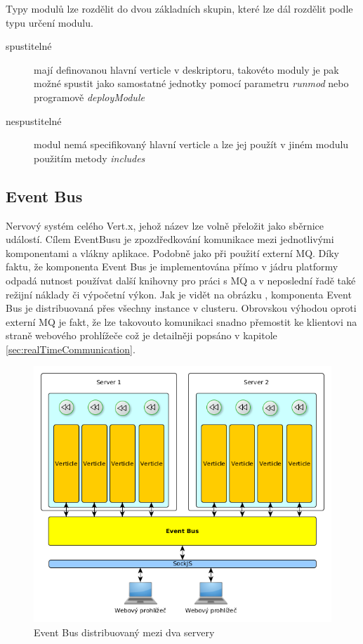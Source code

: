 Typy modulů lze rozdělit do dvou základních skupin, které lze dál rozdělit podle typu určení modulu.

\begin{description}
\item[spustitelné]{mají definovanou hlavní verticle v deskriptoru, takovéto moduly je pak možné spustit jako samostatné jednotky pomocí parametru \emph{runmod} nebo programově \emph{deployModule} }
\item[nespustitelné]{modul nemá specifikovaný hlavní verticle a lze jej použít v jiném modulu použitím metody \emph{includes}}
\end{description}

\subsection{Event Bus}\label{sub:eventBus}

Nervový systém celého Vert.x, jehož název lze volně přeložit jako sběrnice událostí. Cílem EventBusu je zpozdředkování komunikace mezi jednotlivými komponentami a vlákny aplikace. Podobně jako při použití externí MQ. Díky faktu, že komponenta Event Bus je implementována přímo v jádru platformy odpadá nutnost používat další knihovny pro práci s MQ a v neposlední řadě také režijní náklady či výpočetní výkon. Jak je vidět na obrázku , komponenta Event Bus je distribuovaná přes všechny instance v clusteru. Obrovskou výhodou oproti externí MQ je fakt, že lze takovouto komunikaci snadno přemostit ke klientovi na straně webového prohlížeče což je detailněji popsáno v kapitole \ref{sec:realTimeCommunication}.

\begin{figure}
\begin{centering}
\includegraphics[scale=0.5]{obrazky/2instance4_eventbus}
\par\end{centering}
\caption{Event Bus distribuovaný mezi dva servery}
\label{fig:2instance4_eventbus}
\end{figure}


